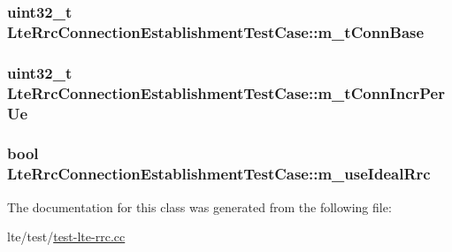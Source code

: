 \subsubsection[{\texorpdfstring{m\+\_\+t\+Conn\+Base}{m_tConnBase}}]{\setlength{\rightskip}{0pt plus 5cm}uint32\+\_\+t Lte\+Rrc\+Connection\+Establishment\+Test\+Case\+::m\+\_\+t\+Conn\+Base\hspace{0.3cm}{\ttfamily [protected]}}\hypertarget{classLteRrcConnectionEstablishmentTestCase_a8212fdb7a75ab8630edd67f7561e5964}{}\label{classLteRrcConnectionEstablishmentTestCase_a8212fdb7a75ab8630edd67f7561e5964}
\subsubsection[{\texorpdfstring{m\+\_\+t\+Conn\+Incr\+Per\+Ue}{m_tConnIncrPerUe}}]{\setlength{\rightskip}{0pt plus 5cm}uint32\+\_\+t Lte\+Rrc\+Connection\+Establishment\+Test\+Case\+::m\+\_\+t\+Conn\+Incr\+Per\+Ue\hspace{0.3cm}{\ttfamily [protected]}}\hypertarget{classLteRrcConnectionEstablishmentTestCase_ac842741be5d5027a4df127c620548ee7}{}\label{classLteRrcConnectionEstablishmentTestCase_ac842741be5d5027a4df127c620548ee7}
\subsubsection[{\texorpdfstring{m\+\_\+use\+Ideal\+Rrc}{m_useIdealRrc}}]{\setlength{\rightskip}{0pt plus 5cm}bool Lte\+Rrc\+Connection\+Establishment\+Test\+Case\+::m\+\_\+use\+Ideal\+Rrc\hspace{0.3cm}{\ttfamily [protected]}}\hypertarget{classLteRrcConnectionEstablishmentTestCase_a631ad66c06ee736fee379d5eddd16589}{}\label{classLteRrcConnectionEstablishmentTestCase_a631ad66c06ee736fee379d5eddd16589}


The documentation for this class was generated from the following file\+:\begin{DoxyCompactItemize}
\item 
lte/test/\hyperlink{test-lte-rrc_8cc}{test-\/lte-\/rrc.\+cc}\end{DoxyCompactItemize}
